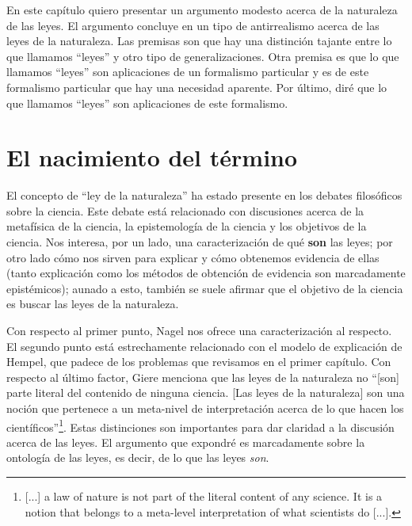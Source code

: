 En este capítulo quiero presentar un argumento modesto acerca de la naturaleza de las leyes. El argumento concluye en un tipo de antirrealismo acerca de las leyes de la naturaleza. Las premisas son%
que hay una distinción tajante entre lo que llamamos ``leyes'' y otro tipo de generalizaciones. Otra premisa es que lo que llamamos ``leyes'' son aplicaciones de un formalismo particular y es de este formalismo particular que hay una necesidad aparente. Por último, diré que lo que llamamos ``leyes'' son aplicaciones de este formalismo.

\section{El nacimiento del término}

\noindent El concepto de ``ley de la naturaleza'' ha estado presente en los debates filosóficos sobre la ciencia. Este debate está relacionado con discusiones acerca de la metafísica de la ciencia, la epistemología de la ciencia y los objetivos de la ciencia. Nos interesa, por un lado, una caracterización de qué \textbf{son} las leyes; por otro lado cómo nos sirven para explicar y cómo obtenemos evidencia de ellas (tanto explicación como los métodos de obtención de evidencia son marcadamente epistémicos); aunado a esto, también se suele afirmar que el objetivo de la ciencia es buscar las leyes de la naturaleza.

Con respecto al primer punto, Nagel nos ofrece una caracterización al respecto. El segundo punto está estrechamente relacionado con el modelo de explicación de Hempel, que padece de los problemas que revisamos en el primer capítulo. Con respecto al último factor, Giere \citeyear[p. 69]{Giere2006} menciona que las leyes de la naturaleza no ``[son] parte literal%
del contenido de ninguna ciencia. [Las leyes de la naturaleza] son una noción que pertenece a un meta-nivel de interpretación acerca de lo que hacen los científicos''\footnote{[...] a law of nature is not part of the literal content of any science. It is a notion that belongs to a meta-level interpretation of what scientists do [...].}. Estas distinciones son importantes para dar claridad a la discusión acerca de las leyes. El argumento que expondré es marcadamente sobre la ontología de las leyes, es decir, de lo que las leyes \textit{son}.

